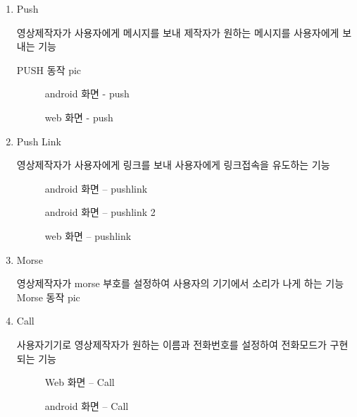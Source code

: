 \documentclass{oblivoir}
\begin{document}
\begin{enumerate}

    \item  Push 

    영상제작자가 사용자에게 메시지를 보내 제작자가 원하는 메시지를 사용자에게 보내는 기능

    PUSH 동작 pic

    \begin{figure}[h!]
    \centering
    \caption{android 화면 - push}
    \end{figure}
    \begin{figure}[h!]
    \centering
    \caption{web 화면 - push}
    \end{figure}

    \item  Push Link 

    영상제작자가 사용자에게 링크를 보내 사용자에게 링크접속을 유도하는 기능

    \begin{figure}[h!]
    \centering
    \caption{android 화면 – pushlink}
    \end{figure}

    \begin{figure}[h!]
    \centering
    \caption{android 화면 – pushlink 2}
    \end{figure}

    \begin{figure}[h!]
    \centering
    \caption{web 화면 – pushlink}
    \end{figure}

    \item  Morse

    영상제작자가 morse 부호를 설정하여 사용자의 기기에서 소리가 나게 하는 기능
    Morse 동작 pic

    \item  Call 

    사용자기기로 영상제작자가 원하는 이름과 전화번호를 설정하여 전화모드가 구현되는 기능

    \begin{figure}[h!]
    \centering
    \caption{Web 화면 – Call}
    \end{figure}


    \begin{figure}[h!]
    \centering
    \caption{android 화면 – Call}
    \end{figure}



\end{enumerate}
\end{document}
